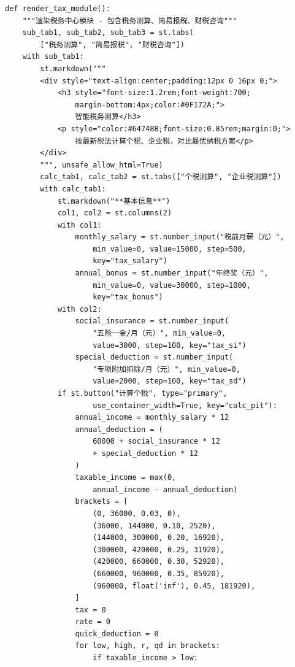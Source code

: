 \documentclass[a4paper,10pt]{article}
\begin{document}
\begin{lstlisting}
def render_tax_module():
    """渲染税务中心模块 - 包含税务测算、简易报税、财税咨询"""
    sub_tab1, sub_tab2, sub_tab3 = st.tabs(
        ["税务测算", "简易报税", "财税咨询"])
    with sub_tab1:
        st.markdown("""
        <div style="text-align:center;padding:12px 0 16px 0;">
            <h3 style="font-size:1.2rem;font-weight:700;
                margin-bottom:4px;color:#0F172A;">
                智能税务测算</h3>
            <p style="color:#64748B;font-size:0.85rem;margin:0;">
                按最新税法计算个税、企业税，对比最优纳税方案</p>
        </div>
        """, unsafe_allow_html=True)
        calc_tab1, calc_tab2 = st.tabs(["个税测算", "企业税测算"])
        with calc_tab1:
            st.markdown("**基本信息**")
            col1, col2 = st.columns(2)
            with col1:
                monthly_salary = st.number_input("税前月薪（元）",
                    min_value=0, value=15000, step=500,
                    key="tax_salary")
                annual_bonus = st.number_input("年终奖（元）",
                    min_value=0, value=30000, step=1000,
                    key="tax_bonus")
            with col2:
                social_insurance = st.number_input(
                    "五险一金/月（元）", min_value=0,
                    value=3000, step=100, key="tax_si")
                special_deduction = st.number_input(
                    "专项附加扣除/月（元）", min_value=0,
                    value=2000, step=100, key="tax_sd")
            if st.button("计算个税", type="primary",
                    use_container_width=True, key="calc_pit"):
                annual_income = monthly_salary * 12
                annual_deduction = (
                    60000 + social_insurance * 12
                    + special_deduction * 12
                )
                taxable_income = max(0,
                    annual_income - annual_deduction)
                brackets = [
                    (0, 36000, 0.03, 0),
                    (36000, 144000, 0.10, 2520),
                    (144000, 300000, 0.20, 16920),
                    (300000, 420000, 0.25, 31920),
                    (420000, 660000, 0.30, 52920),
                    (660000, 960000, 0.35, 85920),
                    (960000, float('inf'), 0.45, 181920),
                ]
                tax = 0
                rate = 0
                quick_deduction = 0
                for low, high, r, qd in brackets:
                    if taxable_income > low:

\end{lstlisting}
\end{document}
